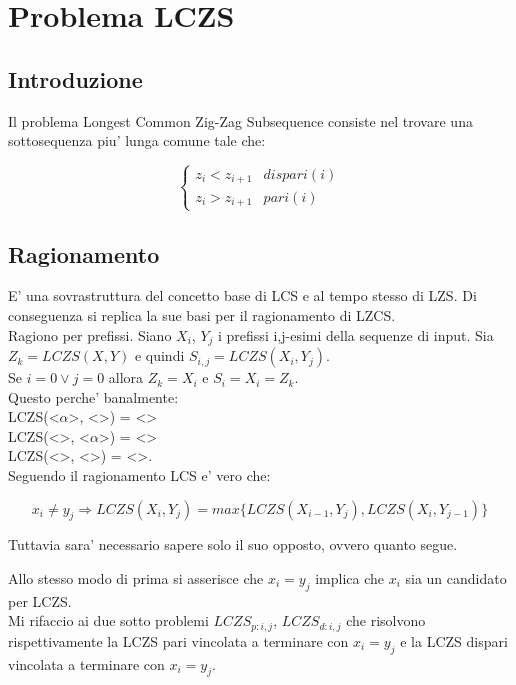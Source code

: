 \chapter{Problema LCZS}

\section{Introduzione}

Il problema Longest Common Zig-Zag Subsequence consiste nel trovare una sottosequenza piu' lunga comune tale che:

\[
    \begin{cases}
        \text{$z_i < z_{i+1}$} & \text{$dispari(i)$} \\
        \text{$z_i > z_{i+1}$} & \text{$pari(i)$}
    \end{cases}
\]

\section{Ragionamento}

E' una sovrastruttura del concetto base di LCS e al tempo stesso di LZS.
Di conseguenza si replica la sue basi per il ragionamento di LZCS. \\

Ragiono per prefissi.
Siano $X_{i}$, $Y_{j}$ i prefissi i,j-esimi della sequenze di input.
Sia $Z_k = LCZS(X, Y)$ e quindi $S_{i,j} = LCZS(X_{i}, Y_{j})$. \\

Se $i = 0 \lor j = 0$ allora $Z_k = X_{i}$ e $S_i = X_i = Z_k$. \\
Questo perche' banalmente: \\
LCZS(<$\alpha$>, <>) = <> \\
LCZS(<>, <$\alpha$>) = <> \\
LCZS(<>, <>) = <>. \\

Seguendo il ragionamento LCS e' vero che:

\[
    x_i \ne y_j \Rightarrow LCZS(X_i, Y_j) = max \{ LCZS(X_{i-1}, Y_{j}), LCZS(X_{i}, Y_{j-1}) \}
\]

Tuttavia sara' necessario sapere solo il suo opposto, ovvero quanto segue.

Allo stesso modo di prima si asserisce che $x_i = y_j$ implica che $x_i$ sia un candidato per LCZS. \\

Mi rifaccio ai due sotto problemi $LCZS_{p:i,j}$, $LCZS_{d:i,j}$ che risolvono rispettivamente
la LCZS pari vincolata a terminare con $x_i = y_j$ e
la LCZS dispari vincolata a terminare con $x_i = y_j$. \\

